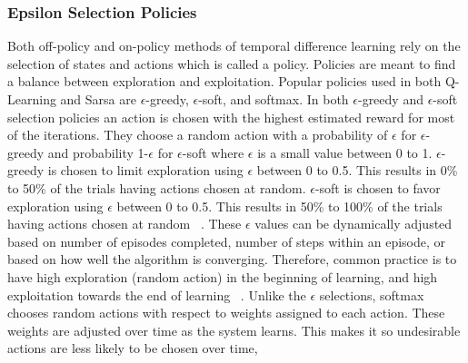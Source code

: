 \documentclass[12pt,american]{report}
\begin{document}
        \subsubsection{Epsilon Selection Policies}
        Both off-policy and on-policy methods of temporal difference learning rely on the selection of states and actions which is called a policy.  Policies are meant to find a balance between exploration and exploitation. Popular policies used in both Q-Learning and Sarsa are \begin{math}\epsilon\end{math}-greedy, \begin{math}\epsilon\end{math}-soft, and softmax.  In both \begin{math}\epsilon\end{math}-greedy and \begin{math}\epsilon\end{math}-soft selection policies an action is chosen with the highest estimated reward for most of the iterations. They choose a random action with a probability of \begin{math}\epsilon\end{math} for \begin{math}\epsilon\end{math}-greedy and probability 1-\begin{math}\epsilon\end{math} for \begin{math}\epsilon\end{math}-soft where \begin{math}\epsilon\end{math} is a small value between 0 to 1. \begin{math}\epsilon\end{math}-greedy is chosen to limit exploration using \begin{math}\epsilon\end{math} between 0 to 0.5. This results in 0\% to 50\% of the trials having actions chosen at random.  \begin{math}\epsilon\end{math}-soft is chosen to favor exploration using \begin{math}\epsilon\end{math} between 0 to 0.5. This results in 50\% to 100\% of the trials having actions chosen at random ~\cite{Eden}. These $\epsilon$ values can be dynamically adjusted based on number of episodes completed, number of steps within an episode, or based on how well the algorithm is converging.  Therefore, common practice is to have high exploration (random action) in the beginning of learning, and high exploitation towards the end of learning ~\cite{Greedy}.  Unlike the \begin{math}\epsilon\end{math} selections, softmax chooses random actions with respect to weights assigned to each action. These weights are adjusted over time as the system learns. This makes it so undesirable actions are less likely to be chosen over time, 
\end{document}
